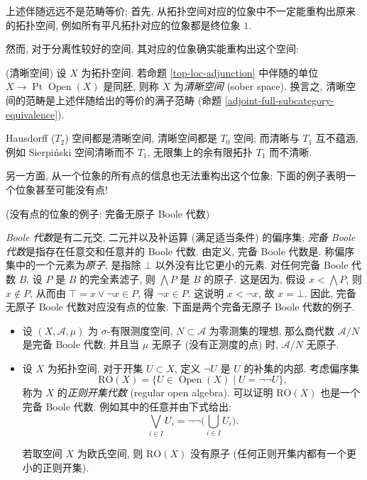 上述伴随远远不是范畴等价; 首先, 从拓扑空间对应的位象中不一定能重构出原来的拓扑空间, 例如所有平凡拓扑对应的位象都是终位象 $1$.

然而, 对于分离性较好的空间, 其对应的位象确实能重构出这个空间:
\begin{definition}
	{(清晰空间)}
	设 $X$ 为拓扑空间. 若命题 \ref{top-loc-adjunction} 中伴随的单位 $X \to \operatorname{Pt}\operatorname{Open}(X)$ 是同胚,
	则称 $X$ 为\emph{清晰空间} (sober space\footnotemark). 换言之, 清晰空间的范畴是上述伴随给出的等价的满子范畴 (命题 \ref{adjoint-full-subcategory-equivalence}).
\end{definition}

\begin{prop}
	{}
	Hausdorff ($T_2$) 空间都是清晰空间, 清晰空间都是 $T_0$ 空间; 而清晰与 $T_1$ 互不蕴涵, 例如 Sierpi\'nski 空间清晰而不 $T_1$, 无限集上的余有限拓扑 $T_1$ 而不清晰.
\end{prop}

另一方面, 从一个位象的所有点的信息也无法重构出这个位象: 下面的例子表明一个位象甚至可能没有点!

\begin{example}
	{(没有点的位象的例子: 完备无原子 Boole 代数)}
	
	\emph{Boole 代数}是有二元交, 二元并以及补运算 (满足适当条件) 的偏序集; \emph{完备 Boole 代数}是指存在任意交和任意并的 Boole 代数.
	由定义, 完备 Boole 代数是\fm.
	称偏序集中的一个元素为\emph{原子}, 是指除 $\bot$ 以外没有比它更小的元素.
	对任何完备 Boole 代数 $B$, 设 $P$ 是 $B$ 的完全素滤子,
	则 $\bigwedge P$ 是 $B$ 的原子. 这是因为, 假设 $x < \bigwedge P$,
	则 $x\notin P$, 从而由 $\top=x\vee\neg x\in P$, 得 $\neg x \in P$. 这说明 $x<\neg x$, 故 $x=\bot$.
	因此, 完备无原子 Boole 代数对应没有点的位象.
	下面是两个完备无原子 Boole 代数的例子.
	
	\begin{itemize}
		\item 设 $(X,\mathcal A,\mu)$ 为 $\sigma$-有限测度空间, $N\subset \mathcal A$ 为零测集的理想,
		那么商代数 $\mathcal A / N$ 是完备 Boole 代数; 并且当 $\mu$ 无原子 (没有正测度的点) 时, $\mathcal A/N$ 无原子.
		\item	
	设 $X$ 为拓扑空间. 对于开集 $U\subset X$, 定义 $\neg U$ 是 $U$ 的补集的内部.
	考虑偏序集
	$$
	\text{RO}(X)
	=
	\big\{U\in\operatorname{Open}(X)\mid U = \neg\neg U\big\},
	$$
	称为 $X$ 的\emph{正则开集代数} (regular open algebra). 可以证明 $\text{RO}(X)$ 也是一个完备 Boole 代数\footnotemark. 例如其中的任意并由下式给出:
	$$
	\bigvee_{i\in I}U_i = \neg\neg\Big(\bigcup_{i\in I}U_i\Big).
	$$
	
	若取空间 $X$ 为欧氏空间, 则 $\text{RO}(X)$ 没有原子 (任何正则开集内都有一个更小的正则开集).
	\end{itemize}
\end{example}

